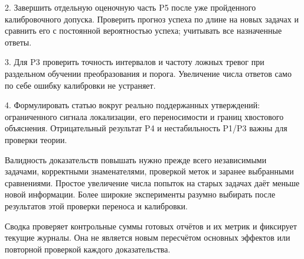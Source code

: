 \documentclass[11pt,a4paper]{article}
\begin{document}
2. Завершить отдельную оценочную часть P5 после уже пройденного калибровочного допуска. Проверить прогноз успеха по длине на новых задачах и сравнить его с постоянной вероятностью успеха; учитывать все назначенные ответы.

3. Для P3 проверить точность интервалов и частоту ложных тревог при раздельном обучении преобразования и порога. Увеличение числа ответов само по себе ошибку калибровки не устраняет.

4. Формулировать статью вокруг реально поддержанных утверждений: ограниченного сигнала локализации, его переносимости и границ хвостового объяснения. Отрицательный результат P4 и нестабильность P1/P3 важны для проверки теории.

Валидность доказательств повышать нужно прежде всего независимыми задачами, корректными знаменателями, проверкой меток и заранее выбранными сравнениями. Простое увеличение числа попыток на старых задачах даёт меньше новой информации. Более широкие эксперименты разумно выбирать после результатов этой проверки переноса и калибровки.

Сводка проверяет контрольные суммы готовых отчётов и их метрик и фиксирует текущие журналы. Она не является новым пересчётом основных эффектов или повторной проверкой каждого доказательства.
\end{document}
